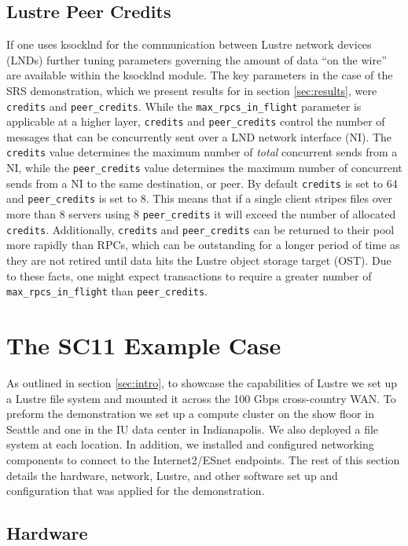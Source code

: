 \documentclass[]{sigplan-proc}
\begin{document}
\subsection{Lustre Peer Credits}

If one uses ksocklnd for the communication between Lustre network devices (LNDs) further tuning parameters
governing the amount of data ``on the wire'' are available within the ksocklnd module. The key parameters in
the case of the SRS demonstration, which we present results for in section \ref{sec:results}, were 
{\tt credits} and {\tt peer\_credits}. While the {\tt max\_rpcs\_in\_flight} parameter is applicable at a higher
layer, {\tt credits} and {\tt peer\_credits} control the number of messages that can be concurrently sent over
a LND network interface (NI). The {\tt credits} value determines the maximum number of {\it total} concurrent
sends from a NI, while the {\tt peer\_credits} value determines the maximum number of concurrent sends from a
NI to the same destination, or peer. By default {\tt credits} is set to 64 and {\tt peer\_credits} is set to
8. This means that if a single client stripes files over more than 8 servers using 8 {\tt peer\_credits} it
will exceed the number of allocated {\tt credits}. Additionally, {\tt credits} and {\tt peer\_credits} can be
returned to their pool more rapidly than RPCs, which can be outstanding for a longer period of time as they are not
retired until data hits the Lustre object storage target (OST). Due to these facts, one might expect
transactions to require a greater number of {\tt max\_rpcs\_in\_flight} than {\tt peer\_credits}.
 

\section {The SC11 Example Case}\label{sec:usecase}

As outlined in section \ref{sec:intro}, to showcase the capabilities of Lustre we set up a Lustre
file system and mounted it across the 100 Gbps cross-country WAN. To preform the demonstration we set up a
compute cluster on the show floor in Seattle and one in the IU data center in Indianapolis. We also deployed a
file system at each location. In addition, we installed and configured networking components to connect to the
Internet2/ESnet endpoints. The rest of this section details the hardware, network, Lustre, and other software
set up and configuration that was applied for the demonstration.

\subsection{Hardware}\label{sec:hardware}
\end{document}

